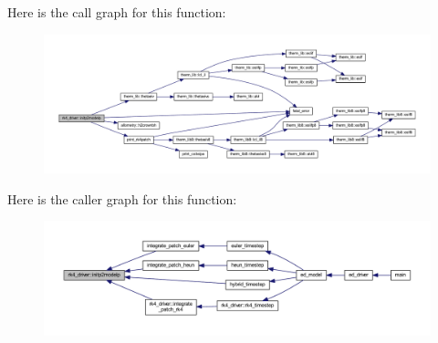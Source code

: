 Here is the call graph for this function\+:\nopagebreak
\begin{figure}[H]
\begin{center}
\leavevmode
\includegraphics[width=350pt]{namespacerk4__driver_ade74d4c727e71886d8b603f09b8708d9_cgraph}
\end{center}
\end{figure}




Here is the caller graph for this function\+:\nopagebreak
\begin{figure}[H]
\begin{center}
\leavevmode
\includegraphics[width=350pt]{namespacerk4__driver_ade74d4c727e71886d8b603f09b8708d9_icgraph}
\end{center}
\end{figure}


